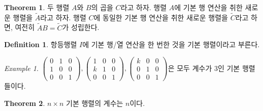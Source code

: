 \documentclass[unfonts,oneside,a4paper]{oblivoir}
\theoremstyle{definition}
\newtheorem{definition}{Definition}
\theoremstyle{theorem}
\newtheorem{theorem}{Theorem}
\theoremstyle{remark}
\theoremstyle{remark}
\theoremstyle{remark}
\newtheorem*{example}{Example}
\theoremstyle{remark}
\begin{document}
\begin{theorem}
    두 행렬 $A$와 $B$의 곱을 $C$라고 하자.
    행렬 $A$에 기본 행 연산을 취한 새로운 행렬을 $\tilde A$라고 하자.
    행렬 $C$에 동일한 기본 행 연산을 취한 새로운 행렬을 $\tilde C$라고 하면, 여전히 $\tilde A B = \tilde C$가 성립한다.
\end{theorem}

\begin{definition}
    항등행렬 $I$에 기본 행/열 연산을 한 번한 것을 기본 행렬이라고 부른다.
\end{definition}

\begin{example}
    $\begin{pmatrix}
        0 & 1 & 0\\
        1 & 0 & 0\\
        0 & 0 & 1
        \end{pmatrix}, \begin{pmatrix}
        1 & 0 & 0\\
        k & 1 & 0\\
        0 & 0 & 1
        \end{pmatrix}, \begin{pmatrix}
        k & 0 & 0\\
        0 & 1 & 0\\
        0 & 0 & 1
    \end{pmatrix}$은 모두 계수가 3인 기본 행렬들이다.
\end{example}

\begin{theorem}
    $n \times n$ 기본 행렬의 계수는 $n$이다.
\end{theorem}
\end{document}
